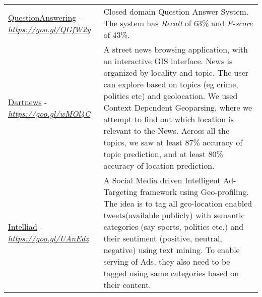 \documentclass[8pt]{article}
\begin{document}
\begin{tabular}[t]{@{}>{\raggedright\arraybackslash}p{\textwidth-\rcollength-150pt}p{\rcollength+150pt}}
        \href{https://github.com/debjyoti385/QuestionAnswerNLP}{QuestionAnswering} -\href{https://goo.gl/QGfW2y}{\textit{https://goo.gl/QGfW2y}} & \hspace{0.5cm}  Closed domain Question Answer System. The system has \emph{Recall} of  63\% and \emph{F-score} of 43\%.   \\[0.1cm]
        \href{https://goo.gl/wMOl4C}{Dartnews} -\href{https://goo.gl/wMOl4C}{\textit{https://goo.gl/wMOl4C}}  & \hspace{0.5cm} A street news browsing application, with an interactive GIS interface. News is organized by locality and topic. The user can explore based on topics (eg crime, politics etc) and geolocation. We used Context Dependent Geoparsing, where we attempt to find out which location is relevant to the News. Across all the topics, we saw at least 87\% accuracy of topic prediction, and at least 80\% accuracy of location prediction.\\
        \href{http://github.com/debjyoti385/intelliad}{Intelliad} -\href{https://goo.gl/UAnEdz}{\textit{https://goo.gl/UAnEdz}} & \hspace{0.5cm} A Social Media driven Intelligent Ad-Targeting framework using Geo-profiling. The idea is to tag all geo-location enabled tweets(available publicly) with semantic categories (say sports, politics etc.) and their sentiment (positive, neutral, negative) using text mining. To enable serving of Ads, they also need to be tagged using same categories based on their content. \\

\end{tabular}
\end{document}
